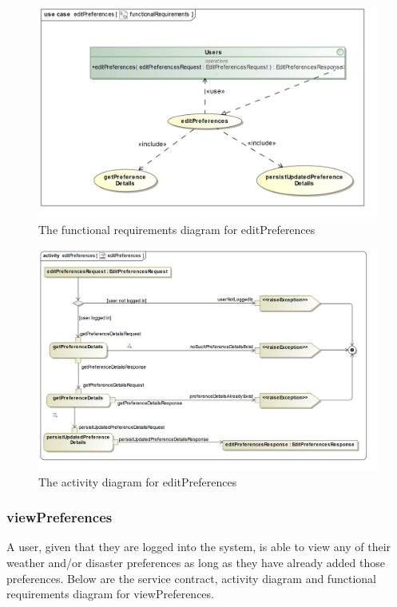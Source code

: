 \begin{figure}[H]
	\centering
	\includegraphics[width=1.0\textwidth]{../images/funcReq/editPreferencesFunctionalRequirements.jpg}
	\caption{The functional requirements diagram for editPreferences \label{overflow}}
\end{figure}

\begin{figure}[H]
	\centering
	\includegraphics[width=1.0\textwidth]{../images/funcReq/editPreferencesActivityDiagram.jpg}
	\caption{The activity diagram for editPreferences \label{overflow}}
\end{figure}

\subsubsection{viewPreferences}

A user, given that they are logged into the system, is able to view any of their weather and/or disaster preferences as long as they have already added those preferences. Below are the service contract, activity diagram and functional requirements diagram for viewPreferences.

